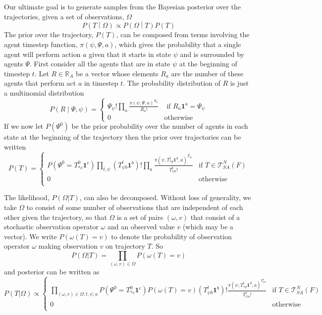 \documentclass{article}
\begin{document}
Our ultimate goal is to generate samples from the Bayesian posterior over the trajectories, given a set of observations, $\Omega$
\[
P\left(T \middle| \Omega\right) \propto P\left(\Omega \middle| T\right)P(T)
\]
The prior over the trajectory, $P(T)$, can be composed from terms involving the agent timestep function, $\pi(\psi,\Psi,a)$, which gives the probability that a single agent will perform action $a$ given that it starts in state $\psi$ and is surrounded by agents $\Psi$. First consider all the agents that are in state $\psi$ at the beginning of timestep $t$. Let $R\in\mathbb{R}_A$ be a vector whose elements $R_a$ are the number of these agents that perform act $a$ in timestep $t$. The probability distribution of $R$ is just a multinomial distribution
\begin{equation}
P\left(R \mid \Psi, \psi\right) = 
\begin{cases}
\Psi_\psi!\prod_a \frac{\pi(\psi,\Psi,a)^{R_ a}}{R_a!} & \text{ if } R_a\mathbf{1}^a = \Psi_\psi \\
0 & \text{otherwise}
\end{cases}
\end{equation}
If we now let $P(\Psi^0)$ be the prior probability over the number of agents in each state at the beginning of the trajectory then the prior over trajectories can be written 
\begin{equation}
P(T) =
\begin{cases}
P(\Psi^0 = T^0_{* c}\mathbf{1}^c)
\prod_{t, \psi}\left(T^t_{\psi b} \mathbf{1}^b \right)!
\prod_a \frac{\pi(\psi, T^{t}_{* d}\mathbf{1}^d,a)^{T^{t}_{\psi a}}}{T^{t}_{\psi a}!} & \text{if } T \in \mathcal{T}^N_{SA}(F) \\
0 & \text{otherwise}\\
\end{cases}
\end{equation}

The likelihood, $P(\Omega|T)$, can also be decomposed. Without loss of generality, we take $\Omega$ to consist of some number of observations that are independent of each other given the trajectory, so that $\Omega$ is a set of pairs $(\omega,v)$ that consist of a stochastic observation operator $\omega$ and an observed value $v$ (which may be a vector). We write $P(\omega(T)=v)$ to denote the probability of observation operator $\omega$ making observation $v$ on trajectory $T$. So
\[
P(\Omega|T) = \prod_{(\omega,v) \in \Omega} P(\omega(T)=v)
\]
and posterior can be written as
\begin{equation}
P(T|\Omega) \propto 
\begin{cases}
\prod_{(\omega,v) \in \Omega,t, \psi, a}
P(\Psi^0 = T^0_{* c}\mathbf{1}^c)
P\left(\omega(T)=v\right)
\left(T^t_{\psi b} \mathbf{1}^b \right)!
\frac{\pi(\psi, T^{t}_{* d}\mathbf{1}^d,a)^{T^{t}_{\psi a}}}{T^{t}_{\psi a}!} & 
 \text{if } T \in \mathcal{T}^N_{SA}(F) \\
0 & \text{otherwise}\\
\end{cases}
\label{posterior}
\end{equation}
\end{document}
